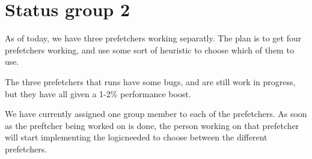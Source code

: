 \documentclass[a4paper,10pt,titlepage]{article}
\begin{document}
\section{Status group 2}
As of today, we have three prefetchers working separatly. The plan is
to get four prefetchers working, and use some sort of heuristic to
choose which of them to use.

The three prefetchers that runs have some bugs, and are still work in
progress, but they have all given a 1-2\% performance boost.

We have currently assigned one group member to each of the
prefetchers. As soon as the preftcher being worked on is done, the
person working on that prefetcher will start implementing the
logicneeded to choose between the different prefetchers.
\end{document}
